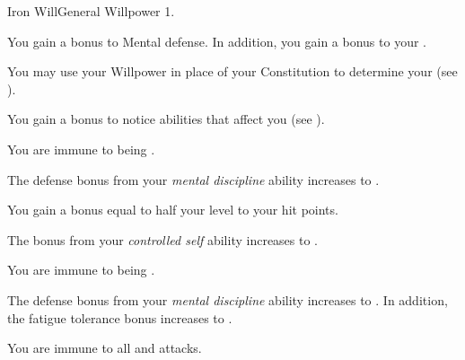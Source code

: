     \begin{feat}{Iron Will}{General}
        \featpre Willpower 1.

         You gain a  bonus to Mental defense.
        In addition, you gain a  bonus to your .

         You may use your Willpower in place of your Constitution to determine your  (see ).

         You gain a  bonus to notice  abilities that affect you (see ).

         You are immune to being \dazed.

         The defense bonus from your \textit{mental discipline} ability increases to .

         You gain a bonus equal to half your level to your hit points.

         The bonus from your \textit{controlled self} ability increases to .

         You are immune to being \stunned.

         The defense bonus from your \textit{mental discipline} ability increases to .
        In addition, the fatigue tolerance bonus increases to .

         You are immune to all  and  attacks.
    \end{feat}

